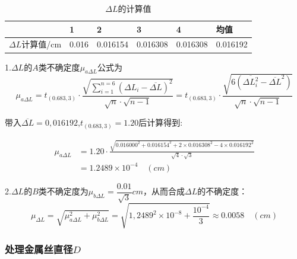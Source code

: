\documentclass[UTF8]{article} %
\begin{document}
\begin{table}[h]
\centering
\begin{tabular}{|l|l|l|l|l|l|}
	\hline
	& 1     & 2        & 3        & 4        & 均值       \\ \hline
	$\Delta L$计算值/cm & 0.016 & 0.016154 & 0.016308 & 0.016308 & 0.016192 \\ \hline
\end{tabular}
\caption{$\Delta L$的计算值}
\end{table}
\par 1.$\Delta L$的$A$类不确定度$\mu_{a\Delta L}$公式为
\[ \mu_{a\Delta L}=t_{(0.683,3)}\cdot\frac{\sqrt{\sum_{i=1}^{n=6}(\Delta L_i-\overline{\Delta L})^2}}{\sqrt{n}\cdot\sqrt{n-1}}=t_{(0.683,3)}\cdot\frac{\sqrt{6(\overline{\Delta L_i^2}-\overline{\Delta L }^2)}}{\sqrt{n}\cdot\sqrt{n-1}}\]
\clearpage
\par 带入$\overline{\Delta L}=0,016192$,\quad$t_{(0.683,3)}=1.20$后计算得到:

\begin{align*}
	\mu_{a\Delta L}&=1.20\cdot \frac{\sqrt{0.016000^2+0.016154^2+2\times0.016308^2-4\times0.016192^2}}{\sqrt{4}\cdot\sqrt{3}}\\
	&=1.2489\times10^{-4}  \quad (cm)     
\end{align*}
\par 2.$\Delta L$的$B$类不确定度为$\mu_{b\Delta L}=\dfrac{0.01}{\sqrt{3}}cm$，从而合成$\Delta L$的不确定度：
\[\mu_{\Delta L}=\sqrt{\mu_{a\Delta L}^2+\mu_{b\Delta L}^2}=\sqrt{1,2489^2\times 10^{-8}+\frac{10^{-4}}{3}}\approx 0.0058\quad(cm)\]

\subsubsection*{处理金属丝直径$D$}
\end{document}
